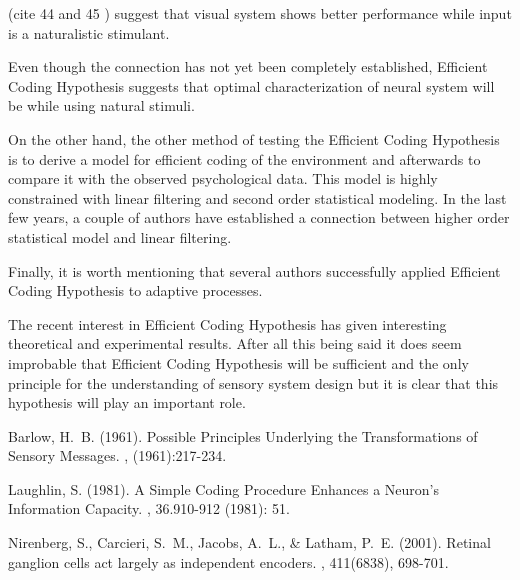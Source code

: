 \documentclass[twoside]{article}
\begin{document}
\begin{multicols}{2}
(cite 44 and 45 ) suggest that visual system shows better performance while input is a naturalistic stimulant. 

Even though the connection has not yet been completely established, Efficient Coding Hypothesis suggests that optimal characterization of neural system will be while using natural stimuli.

On the other hand, the other method of testing the Efficient Coding Hypothesis is to derive a model for efficient coding of the environment and afterwards to compare it with the observed psychological data. This model is highly constrained with linear filtering and second order statistical modeling. In the last few years, a couple of authors have established a connection between higher order statistical model and linear filtering.

Finally, it is worth mentioning that several authors successfully applied Efficient Coding Hypothesis to adaptive processes.

The recent interest in Efficient Coding Hypothesis has given interesting theoretical and experimental results. After all this being said it does seem improbable that Efficient Coding Hypothesis will be sufficient and the only principle for the understanding of sensory system design but it is clear that this hypothesis will play an important role.










\begin{thebibliography}{99} 

Barlow, H.~B. (1961).
\newblock Possible Principles Underlying the Transformations of Sensory Messages.
, (1961):217-234.

Laughlin, S. (1981).
\newblock A Simple Coding Procedure Enhances a Neuron's Information Capacity.
, 36.910-912 (1981): 51.

Nirenberg, S., Carcieri, S.~M., Jacobs, A.~L., \& Latham, P.~E. (2001).
\newblock Retinal ganglion cells act largely as independent encoders.
, 411(6838), 698-701.


\end{thebibliography}
\end{multicols}
\end{document}
